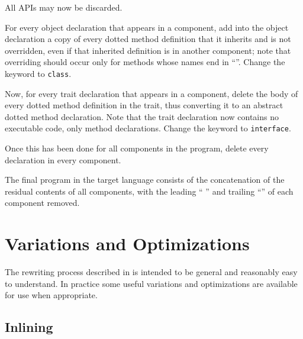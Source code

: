 All APIs may now be discarded.

For every object declaration that appears in a component,
add into the object declaration a copy of every dotted method definition that it inherits
and is not overridden, even if that inherited definition is in another component; note that overriding should occur only for methods
whose names end in ``''.
Change the keyword  to {\tt class}.

Now, for every trait declaration that appears in a component,
delete the body of every dotted method definition in the trait,
thus converting it to an abstract dotted method declaration.
Note that the trait declaration now contains no executable code,
only method declarations.
Change the keyword  to {\tt interface}.

Once this has been done for all components in the program,
delete every  declaration in every component.

The final program in the target language consists of
the concatenation of the residual contents of all components, with the
leading `` '' and trailing ``''
of each component removed.


\section{Variations and Optimizations}

The rewriting process described in  is
intended to be general and reasonably easy to understand.
In practice some useful variations and optimizations
are available for use when appropriate.

\subsection{Inlining}

